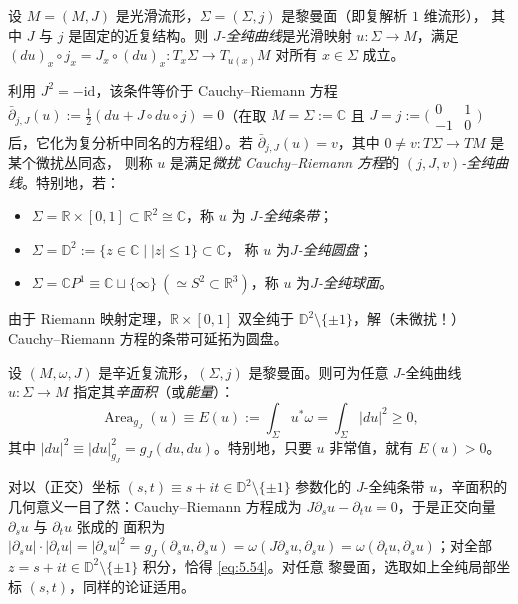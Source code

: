 \begin{Def}\label{def:5.7}
设 $M=(M,J)$ 是光滑流形，$\Sigma=(\Sigma,j)$ 是黎曼面（即复解析 $1$ 维流形），
其中 $J$ 与 $j$ 是固定的近复结构。则 \emph{$J$-全纯曲线}是光滑映射
$u:\Sigma\to M$，满足 $(du)_x\circ j_x=J_x\circ(du)_x:T_x\Sigma\to T_{u(x)}M$
对所有 $x\in\Sigma$ 成立。

利用 $J^2=-\mathrm{id}$，该条件等价于 Cauchy--Riemann 方程
$\bar\partial_{j,J}(u):=\frac12(du+J\circ du\circ j)=0$（在取
$M=\Sigma:=\mathbb C$ 且 $J=j:=\bigl(\begin{smallmatrix}0&1\\-1&0
\end{smallmatrix}\bigr)$ 后，它化为复分析中同名的方程组）。若
$\bar\partial_{j,J}(u)=v$，其中 $0\neq v:T\Sigma\to TM$ 是某个微扰丛同态，
则称 $u$ 是满足\emph{微扰 Cauchy--Riemann 方程}的
\emph{$(j,J,v)$-全纯曲线}。特别地，若：
\begin{itemize}
  \item $\Sigma=\mathbb R\times[0,1]\subset\mathbb R^2\cong\mathbb C$，称 $u$ 为
  \emph{$J$-全纯条带}；
  \item $\Sigma=\mathbb D^2:=\{z\in\mathbb C\mid |z|\le1\}\subset\mathbb C$，
  称 $u$ 为\emph{$J$-全纯圆盘}；
  \item $\Sigma=\mathbb C P^1\equiv\mathbb C\sqcup\{\infty\}
  \ (\simeq S^2\subset\mathbb R^3)$，称 $u$ 为\emph{$J$-全纯球面}。
\end{itemize}
由于 Riemann 映射定理，$\mathbb R\times[0,1]$ 双全纯于
$\mathbb D^2\setminus\{\pm1\}$，解（未微扰！）Cauchy--Riemann 方程的条带可延拓为圆盘。
\end{Def}

\begin{Def}\label{def:5.8}
设 $(M,\omega,J)$ 是辛近复流形，$(\Sigma,j)$ 是黎曼面。则可为任意
$J$-全纯曲线 $u:\Sigma\to M$ 指定其\emph{辛面积}（或\emph{能量}）：
\begin{equation}
\operatorname{Area}_{g_J}(u)\equiv E(u):=\int_\Sigma u^*\omega
=\int_\Sigma|du|^2\ge0,
\label{eq:5.54}
\end{equation}
其中 $|du|^2\equiv|du|^2_{g_J}=g_J(du,du)$。特别地，只要 $u$ 非常值，就有
$E(u)>0$。
\end{Def}

对以（正交）坐标 $(s,t)\equiv s+it\in\mathbb D^2\setminus\{\pm1\}$ 参数化的
$J$-全纯条带 $u$，辛面积的几何意义一目了然：Cauchy--Riemann 方程成为
$J\partial_su-\partial_tu=0$，于是正交向量 $\partial_su$ 与 $\partial_tu$ 张成的
面积为 $|\partial_su|\cdot|\partial_tu|=|\partial_su|^2=g_J(\partial_su,\partial_su)
=\omega(J\partial_su,\partial_su)=\omega(\partial_tu,\partial_su)$；对全部
$z=s+it\in\mathbb D^2\setminus\{\pm1\}$ 积分，恰得 \eqref{eq:5.54}。对任意
黎曼面，选取如上全纯局部坐标 $(s,t)$，同样的论证适用。


